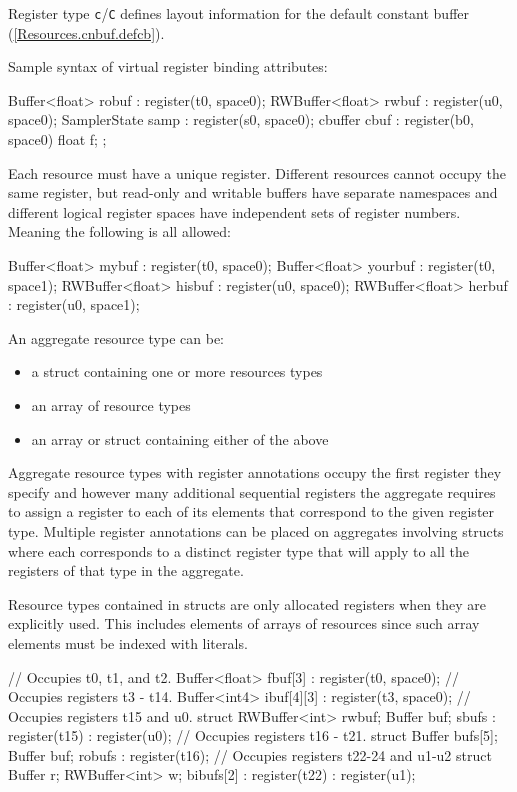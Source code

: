 Register type \texttt{c}/\texttt{C} defines layout information for the default
constant buffer (\ref{Resources.cnbuf.defcb}).

Sample syntax of virtual register binding attributes:
\begin{HLSL}
  Buffer<float> robuf : register(t0, space0);
  RWBuffer<float> rwbuf : register(u0, space0);
  SamplerState samp : register(s0, space0);
  cbuffer cbuf : register(b0, space0) { float f; };
\end{HLSL}

Each resource must have a unique register. Different resources cannot occupy the same register,
but read-only and writable buffers have separate namespaces and different logical register spaces have independent
sets of register numbers. Meaning the following is all allowed:
\begin{HLSL}
  Buffer<float> mybuf : register(t0, space0);
  Buffer<float> yourbuf : register(t0, space1);
  RWBuffer<float> hisbuf : register(u0, space0);
  RWBuffer<float> herbuf : register(u0, space1);
\end{HLSL}

An aggregate resource type can be:
\begin{itemize}
\item a struct containing one or more resources types
\item an array of resource types
\item an array or struct containing either of the above
\end{itemize}

Aggregate resource types with register annotations
occupy the first register they specify and however many additional sequential registers
the aggregate requires to assign a register to each of its elements that correspond to the given register type.
Multiple register annotations can be placed on aggregates involving structs where each corresponds to a distinct
register type that will apply to all the registers of that type in the aggregate.

\begin{note}
Resource types contained in structs are only allocated registers when they are explicitly used.
This includes elements of arrays of resources since such array elements must be indexed with literals.
\end{note}

\begin{HLSL}
  // Occupies t0, t1, and t2.
  Buffer<float> fbuf[3] : register(t0, space0);
  // Occupies registers t3 - t14.
  Buffer<int4> ibuf[4][3] : register(t3, space0);
  // Occupies registers t15 and u0.
  struct {RWBuffer<int> rwbuf; Buffer buf;} sbufs : register(t15) : register(u0);
  // Occupies registers t16 - t21.
  struct {Buffer bufs[5]; Buffer buf;} robufs : register(t16);
  // Occupies registers t22-24 and u1-u2
  struct {Buffer r; RWBuffer<int> w;} bibufs[2] : register(t22) : register(u1);
\end{HLSL}

